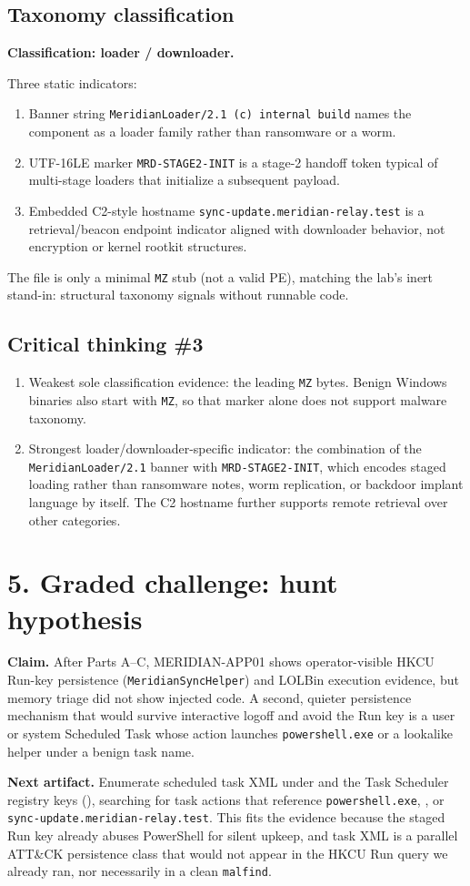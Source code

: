 \documentclass[11pt,letterpaper]{article}
\newcommand{\labpart}[1]{%
  \par\vspace{0.35em}%
  \Needspace{8\baselineskip}%
  \section*{#1}%
  \nopagebreak
}
\newcommand{\labstep}[1]{%
  \Needspace{6\baselineskip}%
  \subsection*{#1}%
  \nopagebreak
}
\begin{document}
\labstep{Taxonomy classification}

\textbf{Classification: loader / downloader.}

Three static indicators:
\begin{enumerate}
  \item Banner string \texttt{MeridianLoader/2.1 (c) internal build} names the component as a loader family rather than ransomware or a worm.
  \item UTF-16LE marker \texttt{MRD-STAGE2-INIT} is a stage-2 handoff token typical of multi-stage loaders that initialize a subsequent payload.
  \item Embedded C2-style hostname \texttt{sync-update.meridian-relay.test} is a retrieval/beacon endpoint indicator aligned with downloader behavior, not encryption or kernel rootkit structures.
\end{enumerate}

The file is only a minimal \texttt{MZ} stub (not a valid PE), matching the lab's inert stand-in: structural taxonomy signals without runnable code.

\labstep{Critical thinking \#3}

\begin{enumerate}
  \item Weakest sole classification evidence: the leading \texttt{MZ} bytes. Benign Windows binaries also start with \texttt{MZ}, so that marker alone does not support malware taxonomy.
  \item Strongest loader/downloader-specific indicator: the combination of the \texttt{MeridianLoader/2.1} banner with \texttt{MRD-STAGE2-INIT}, which encodes staged loading rather than ransomware notes, worm replication, or backdoor implant language by itself. The C2 hostname further supports remote retrieval over other categories.
\end{enumerate}

\labpart{5. Graded challenge: hunt hypothesis}

\textbf{Claim.} After Parts A--C, MERIDIAN-APP01 shows operator-visible HKCU Run-key
persistence (\texttt{MeridianSyncHelper}) and LOLBin execution evidence, but memory
triage did not show injected code. A second, quieter persistence mechanism that
would survive interactive logoff and avoid the Run key is a user or system
Scheduled Task whose action launches \texttt{powershell.exe} or a lookalike helper
under a benign task name.

\textbf{Next artifact.} Enumerate scheduled task XML under
 and the Task Scheduler registry keys
(),
searching for task actions that reference \texttt{powershell.exe},
, or \texttt{sync-update.meridian-relay.test}. This fits the
evidence because the staged Run key already abuses PowerShell for silent upkeep,
and task XML is a parallel ATT\&CK persistence class that would not appear in the
HKCU Run query we already ran, nor necessarily in a clean \texttt{malfind}.
\end{document}
